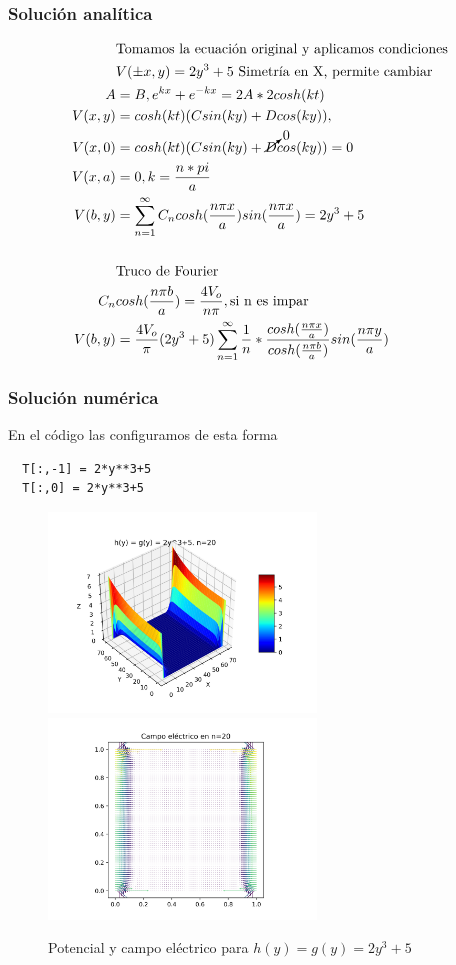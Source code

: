 \documentclass[10pt,journal,compsoc]{IEEEtran}
\begin{document}
\subsubsection{Solución analítica}

\begin{align*}
  &\text{Tomamos la ecuación original y aplicamos condiciones}\\
  &V(\pm x,y) = 2y^3 + 5 \text{ Simetría en X, permite cambiar} \\
  A &= B, e^{kx} + e^{-kx} = 2A*2cosh(kt)\\
  V(x,y) &= cosh(kt)(C sin(ky) + D cos(ky)),\\
  V(x,0) &= cosh(kt)(C sin(ky) + \cancelto{0}{D} cos(ky)) = 0\\
  V(x,a) &= 0, k = \frac{n*pi}{a}\\
  V(b,y) &= \sum_{n=1}^{\infty} C_n cosh(\frac{n\pi x}{a}) sin(\frac{n\pi x}{a}) = 2y^3 + 5\\
  \\
  &\text{Truco de Fourier}\\
  C_n& cosh(\frac{n\pi b}{a}) = \frac{4V_o}{n\pi}, \text{si n es impar}\\
  V(b,y) &= \frac{4V_o}{\pi}(2y^3 + 5) \sum_{n=1}^{\infty} \frac{1}{n} * \frac{cosh(\frac{n\pi x}{a})}{cosh(\frac{n\pi b}{a})} sin(\frac{n\pi y}{a})
\end{align*}

\subsubsection{Solución numérica}

En el código las configuramos de esta forma
\begin{lstlisting}
  T[:,-1] = 2*y**3+5
  T[:,0] = 2*y**3+5
\end{lstlisting}

\begin{figure}
  \centering
  \includegraphics[width=2.8in]{images/2y3-n20}
  \includegraphics[width=2.8in]{images/2y3-field}
  \caption{Potencial y campo eléctrico para \(h(y) = g(y) = 2y^3+5\)}
  \label{2y3-n20}
\end{figure}
\end{document}
